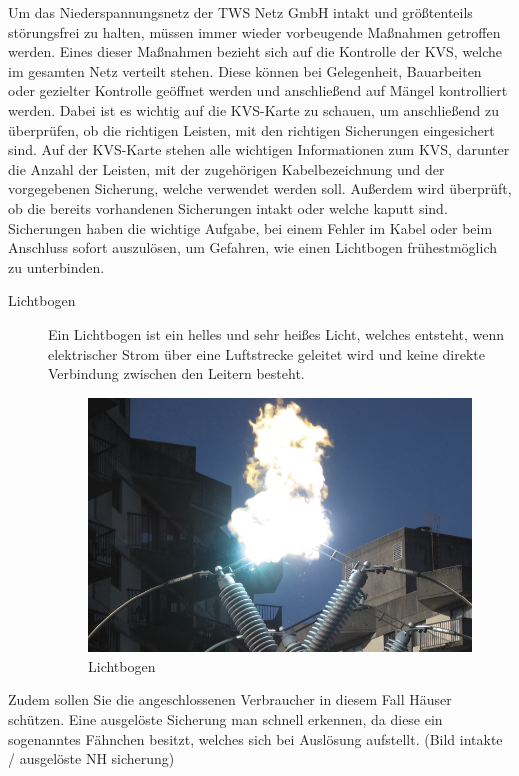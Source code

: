 Um das Niederspannungsnetz der TWS Netz GmbH intakt und größtenteils störungsfrei zu halten, müssen immer wieder vorbeugende Maßnahmen getroffen werden. 
Eines dieser Maßnahmen bezieht sich auf die Kontrolle der KVS, welche im gesamten Netz verteilt stehen. Diese können bei Gelegenheit, Bauarbeiten oder 
gezielter Kontrolle geöffnet werden und anschließend auf Mängel kontrolliert werden. Dabei ist es wichtig auf die KVS-Karte zu schauen, um anschließend 
zu überprüfen, ob die richtigen Leisten, mit den richtigen Sicherungen eingesichert sind. Auf der KVS-Karte stehen alle wichtigen Informationen zum KVS, 
darunter die Anzahl der Leisten, mit der zugehörigen Kabelbezeichnung und der vorgegebenen Sicherung, welche verwendet werden soll.  Außerdem wird überprüft, 
ob die bereits vorhandenen Sicherungen intakt oder welche kaputt sind. Sicherungen haben die wichtige Aufgabe, bei einem Fehler im Kabel oder beim Anschluss 
sofort auszulösen, um Gefahren, wie einen Lichtbogen frühestmöglich zu unterbinden. 
\begin{description}
\item[Lichtbogen] Ein Lichtbogen ist ein helles und sehr heißes Licht, welches entsteht, wenn elektrischer Strom über eine Luftstrecke geleitet wird und 
keine direkte Verbindung zwischen den Leitern besteht.
\begin{figure}[hbt]
\centering
\includegraphics[width=0.87\linewidth]{images/Lichtbogen}
\caption[Lichtbogen]{Lichtbogen \autocite{Tipler.2019}}
\label{fig:Lichtbogen}
\end{figure}
\end{description}
Zudem sollen Sie die angeschlossenen Verbraucher in diesem Fall Häuser schützen. Eine ausgelöste Sicherung man schnell erkennen, da diese ein sogenanntes 
Fähnchen besitzt, welches sich bei Auslösung aufstellt. (Bild intakte / ausgelöste NH sicherung) 
